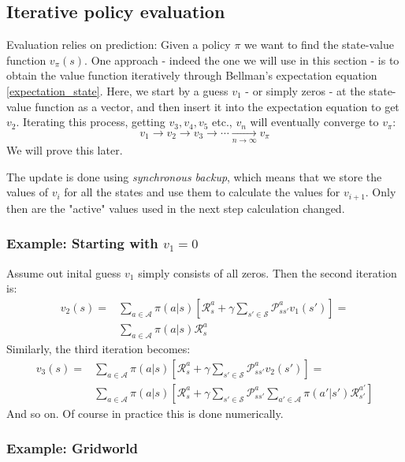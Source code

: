 \documentclass[12pt, a4paper]{article}
\numberwithin{equation}{section}
\begin{document}
\subsection{Iterative policy evaluation}
Evaluation relies on prediction: Given a policy $\pi$ we want to find the state-value function $v_\pi(s)$. One approach - indeed the one we will use in this section - is to obtain the value function iteratively through Bellman's expectation equation \ref{expectation_state}. Here, we start by a guess $v_1$ - or simply zeros - at the state-value function as a vector, and then insert it into the expectation equation to get $v_2$. Iterating this process, getting $v_3, v_4, v_5$ etc., $v_n$ will eventually converge to $v_\pi$:
\begin{equation}
v_1\rightarrow v_2\rightarrow v_3\rightarrow\cdots\underset{n\rightarrow\infty}{\rightarrow}v_\pi
\end{equation}
We will prove this later.

The update is done using \textit{synchronous backup}, which means that we store the values of $v_i$ for all the states and use them to calculate the values for $v_{i+1}$. Only then are the "active" values used in the next step calculation changed.

\subsubsection{Example: Starting with $v_1=0$}
Assume out inital guess $v_1$ simply consists of all zeros. Then the second iteration is:
\begin{align}
v_2(s)=&\sum_{a\in\mathcal{A}}\pi(a|s)\left[\mathcal{R}^a_s+\gamma\sum_{s'\in\mathcal{S}}\mathcal{P}^a_{ss'}v_1(s')\right]=\\
&\sum_{a\in\mathcal{A}}\pi(a|s)\mathcal{R}^a_s
\end{align}
Similarly, the third iteration becomes:
\begin{align}
v_3(s)=&\sum_{a\in\mathcal{A}}\pi(a|s)\left[\mathcal{R}^a_s+\gamma\sum_{s'\in\mathcal{S}}\mathcal{P}^a_{ss'}v_2(s')\right]=\\
&\sum_{a\in\mathcal{A}}\pi(a|s)\left[\mathcal{R}^a_s+\gamma\sum_{s'\in\mathcal{S}}\mathcal{P}^a_{ss'}\sum_{a'\in\mathcal{A}}\pi(a'|s')\mathcal{R}^{a'}_{s'}\right]
\end{align}
And so on. Of course in practice this is done numerically.

\subsubsection{Example: Gridworld}
\end{document}
